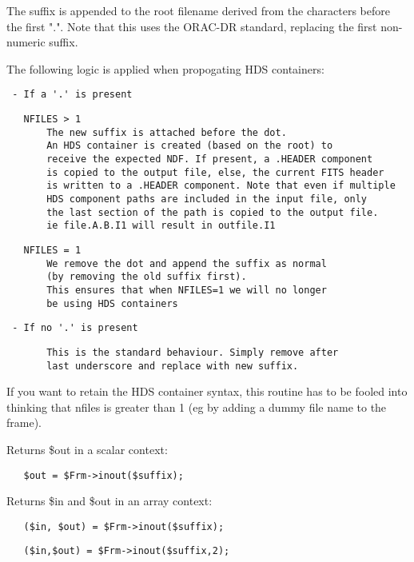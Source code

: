 \begin{description}
\begin{description}
\begin{description}
The suffix is appended to the root filename derived from the characters
before the first ".". Note that this uses the ORAC-DR standard, replacing
the first non-numeric suffix.



The following logic is applied when propogating HDS containers:

\begin{verbatim}
 - If a '.' is present
\end{verbatim}
\begin{verbatim}
   NFILES > 1
       The new suffix is attached before the dot.
       An HDS container is created (based on the root) to
       receive the expected NDF. If present, a .HEADER component
       is copied to the output file, else, the current FITS header
       is written to a .HEADER component. Note that even if multiple
       HDS component paths are included in the input file, only
       the last section of the path is copied to the output file.
       ie file.A.B.I1 will result in outfile.I1
\end{verbatim}
\begin{verbatim}
   NFILES = 1
       We remove the dot and append the suffix as normal
       (by removing the old suffix first).
       This ensures that when NFILES=1 we will no longer
       be using HDS containers
\end{verbatim}
\begin{verbatim}
 - If no '.' is present
\end{verbatim}
\begin{verbatim}
       This is the standard behaviour. Simply remove after
       last underscore and replace with new suffix.
\end{verbatim}


If you want to retain the HDS container syntax, this routine has to be
fooled into thinking that nfiles is greater than 1 (eg by adding a dummy
file name to the frame).



Returns \$out in a scalar context:

\begin{verbatim}
   $out = $Frm->inout($suffix);
\end{verbatim}


Returns \$in and \$out in an array context:

\begin{verbatim}
   ($in, $out) = $Frm->inout($suffix);
\end{verbatim}
\begin{verbatim}
   ($in,$out) = $Frm->inout($suffix,2);
\end{verbatim}



\end{description}
\end{description}
\end{description}
